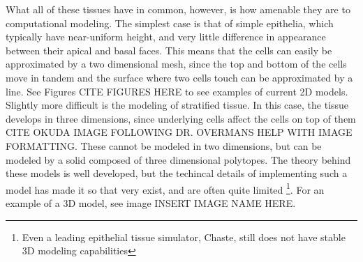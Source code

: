 What all of these tissues have in common, however, is how amenable they are to computational modeling. The simplest case is that of simple epithelia, which typically have near-uniform height, and very little difference in appearance between their apical and basal faces. This means that the cells can easily be approximated by a two dimensional mesh, since the top and bottom of the cells move in tandem and the surface where two cells touch can be approximated by a line. See Figures CITE FIGURES HERE to see examples of current 2D models.  Slightly more difficult is the modeling of stratified tissue. In this case, the tissue develops in three dimensions, since underlying cells affect the cells on top of them CITE OKUDA IMAGE FOLLOWING DR. OVERMANS HELP WITH IMAGE FORMATTING. These cannot be modeled in two dimensions, but can be modeled by a solid composed of three dimensional polytopes. The theory behind these models is well developed, but the techincal details of implementing such a model has made it so that very exist, and are often quite limited \footnote{Even a leading epithelial tissue simulator, Chaste, still does not have stable 3D modeling capabilities}. For an example of a 3D model, see image INSERT IMAGE NAME HERE.

